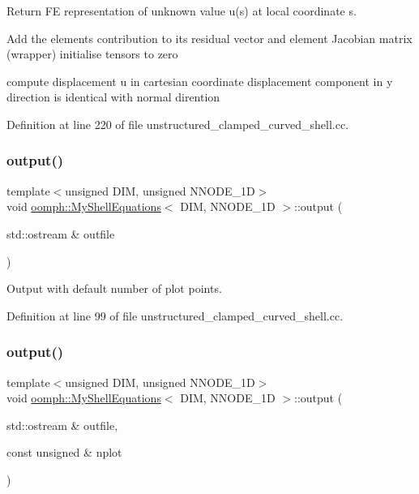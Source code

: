 Return FE representation of unknown value u(s) at local coordinate s. 

Add the element\textquotesingle{}s contribution to its residual vector and element Jacobian matrix (wrapper) initialise tensors to zero

compute displacement u in cartesian coordinate displacement component in y direction is identical with normal dirention 

Definition at line 220 of file unstructured\+\_\+clamped\+\_\+curved\+\_\+shell.\+cc.

\mbox{\label{classoomph_1_1MyShellEquations_aa5434267aa4c3a6f0b86d9afbb18f0a5}} 
\subsubsection{\texorpdfstring{output()}{output()}\hspace{0.1cm}{\footnotesize\ttfamily [1/4]}}
{\footnotesize\ttfamily template$<$unsigned D\+IM, unsigned N\+N\+O\+D\+E\+\_\+1D$>$ \\
void \hyperlink{classoomph_1_1MyShellEquations}{oomph\+::\+My\+Shell\+Equations}$<$ D\+IM, N\+N\+O\+D\+E\+\_\+1D $>$\+::output (\begin{DoxyParamCaption}\item[{std\+::ostream \&}]{outfile }\end{DoxyParamCaption})\hspace{0.3cm}{\ttfamily [inline]}}



Output with default number of plot points. 



Definition at line 99 of file unstructured\+\_\+clamped\+\_\+curved\+\_\+shell.\+cc.

\mbox{\label{classoomph_1_1MyShellEquations_ad4ad93d1ef0640f5ded693e0bc46aeb6}} 
\subsubsection{\texorpdfstring{output()}{output()}\hspace{0.1cm}{\footnotesize\ttfamily [2/4]}}
{\footnotesize\ttfamily template$<$unsigned D\+IM, unsigned N\+N\+O\+D\+E\+\_\+1D$>$ \\
void \hyperlink{classoomph_1_1MyShellEquations}{oomph\+::\+My\+Shell\+Equations}$<$ D\+IM, N\+N\+O\+D\+E\+\_\+1D $>$\+::output (\begin{DoxyParamCaption}\item[{std\+::ostream \&}]{outfile,  }\item[{const unsigned \&}]{nplot }\end{DoxyParamCaption})}




